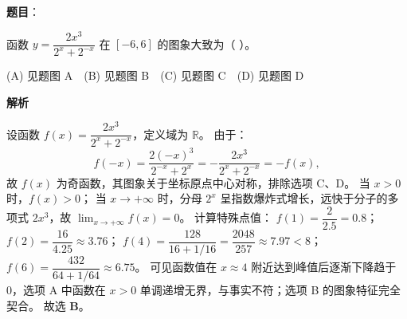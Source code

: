 \begin{answer}

\textbf{题目}：

函数 $y = \dfrac{2x^3}{2^x + 2^{-x}}$ 在 $[-6, 6]$ 的图象大致为（ ）。
\nopagebreak[4]
\begin{center}\end{center}
\nopagebreak[4]
(A) 见题图 A　(B) 见题图 B　(C) 见题图 C　(D) 见题图 D

\textbf{解析}

设函数 $f(x) = \dfrac{2x^3}{2^x + 2^{-x}}$，定义域为 $\mathbb{R}$。
由于：
\nopagebreak[4]
\[f(-x) = \frac{2(-x)^3}{2^{-x} + 2^x} = -\frac{2x^3}{2^x + 2^{-x}} = -f(x),\]
故 $f(x)$ 为奇函数，其图象关于坐标原点中心对称，排除选项 C、D。
当 $x > 0$ 时，$f(x) > 0$；
当 $x \to +\infty$ 时，分母 $2^x$ 呈指数爆炸式增长，远快于分子的多项式 $2x^3$，故 $\lim_{x \to +\infty} f(x) = 0$。
计算特殊点值：
$f(1) = \dfrac{2}{2.5} = 0.8$；
$f(2) = \dfrac{16}{4.25} \approx 3.76$；
$f(4) = \dfrac{128}{16 + 1/16} = \dfrac{2048}{257} \approx 7.97 < 8$；
$f(6) = \dfrac{432}{64 + 1/64} \approx 6.75$。
可见函数值在 $x \approx 4$ 附近达到峰值后逐渐下降趋于 0，选项 A 中函数在 $x > 0$ 单调递增无界，与事实不符；选项 B 的图象特征完全契合。
故选 \textbf{B}。


\end{answer}
